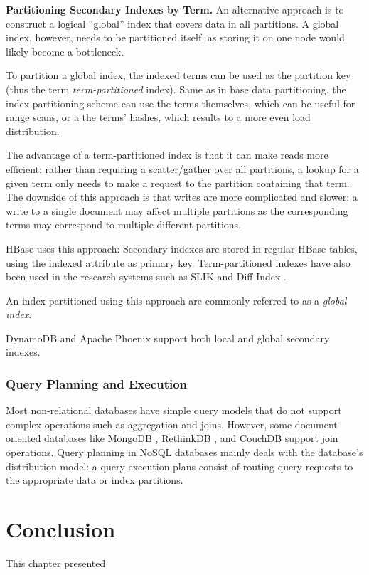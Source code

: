 \bigskip
\noindent
\textbf{Partitioning Secondary Indexes by Term.}
An alternative approach is to construct a logical ``global'' index that covers data in all partitions.
A global index, however, needs to be partitioned itself, as storing it on one node would likely become a bottleneck.

To partition a global index, the indexed terms can be used as the partition key (thus the term \textit{term-partitioned}
index).
Same as in base data partitioning, the index partitioning scheme can use the terms themselves, which can be useful for
range scans, or a the terms' hashes, which results to a more even load distribution.

The advantage of a term-partitioned index is that it can make reads more efficient:
rather than requiring a scatter/gather over all partitions, a lookup for a given term only needs to make a request to the
partition containing that term.
The downside of this approach is that writes are more complicated and slower:
a write to a single document may affect multiple partitions as the corresponding terms may correspond to multiple
different partitions.

HBase \cite{hbase:secondaryindexes} uses this approach:
Secondary indexes are stored in regular HBase tables, using the indexed attribute as primary key.
Term-partitioned indexes have also been used in the research systems such as SLIK \cite{kejriwal:slik}
and Diff-Index \cite{tan:diffindex}.

An index partitioned using this approach are commonly referred to as a \textit{global index}.

\medskip
\noindent
DynamoDB \cite{dynamodb:secondaryindexes} and Apache Phoenix \cite{phoenix:secondaryidnexing} support both local and global secondary indexes.

\subsubsection{Query Planning and Execution}

Most non-relational databases have simple query models that do not support complex operations such as aggregation and
joins.
However, some document-oriented databases like MongoDB \cite{mongodb:joins}, RethinkDB \cite{rethinkdb:joins},
and CouchDB \cite{couchdb:joins} support join operations.
Query planning in NoSQL databases mainly deals with the database's distribution model:
a query execution plans consist of routing query requests to the appropriate data or index partitions.


\section{Conclusion}

This chapter presented